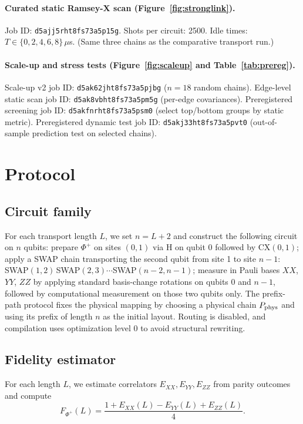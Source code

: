 \documentclass[11pt]{article}
\begin{document}
\paragraph{Curated static Ramsey-X scan (Figure~\ref{fig:stronglink}).}
Job ID: \texttt{d5ajj5rht8fs73a5p15g}. Shots per circuit: 2500. Idle times:
$T \in \{0, 2, 4, 6, 8\}\,\mu$s. (Same three chains as the comparative
transport run.)

\paragraph{Scale-up and stress tests (Figure~\ref{fig:scaleup} and
Table~\ref{tab:prereg}).}
Scale-up v2 job ID: \texttt{d5ak62jht8fs73a5pjbg} ($n=18$ random chains).
Edge-level static scan job ID: \texttt{d5ak8vbht8fs73a5pm5g} (per-edge
covariances). Preregistered screening job ID: \texttt{d5akfnrht8fs73a5psm0}
(select top/bottom groups by static metric). Preregistered dynamic test job
ID: \texttt{d5akj33ht8fs73a5pvt0} (out-of-sample prediction test on selected
chains).

\section{Protocol}
\subsection{Circuit family}
For each transport length $L$, we set $n = L+2$ and construct the following
circuit on $n$ qubits: prepare $\Phi^+$ on sites $(0,1)$ via H on qubit 0
followed by CX$(0,1)$; apply a SWAP chain transporting the second qubit from
site 1 to site $n{-}1$: SWAP$(1,2)\,$SWAP$(2,3)\cdots$SWAP$(n{-}2,n{-}1)$;
measure in Pauli bases $XX$, $YY$, $ZZ$ by applying standard basis-change
rotations on qubits 0 and $n{-}1$, followed by computational measurement on
those two qubits only. The prefix-path protocol fixes the physical mapping by
choosing a physical chain $P_{\rm phys}$ and using its prefix of length $n$
as the initial layout. Routing is disabled, and compilation uses optimization
level 0 to avoid structural rewriting.

\subsection{Fidelity estimator}
For each length $L$, we estimate correlators $E_{XX}, E_{YY}, E_{ZZ}$ from
parity outcomes and compute
\begin{equation}
F_{\Phi^+}(L) = \frac{1 + E_{XX}(L) - E_{YY}(L) + E_{ZZ}(L)}{4}.
\end{equation}
\end{document}
